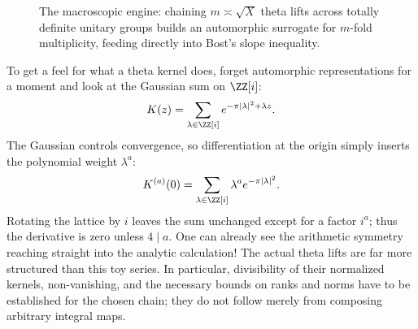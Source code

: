 \begin{figure}[htbp]
\centering
{}
\caption{The macroscopic engine: chaining \(m \asymp \sqrt{X}\) theta lifts across totally definite unitary groups builds an automorphic surrogate for \(m\)-fold multiplicity, feeding directly into Bost's slope inequality.}
\label{fig:N20261125-theta-chain}
\end{figure}

To get a feel for what a theta kernel does, forget automorphic representations for a moment and look at the Gaussian sum on \(\ZZ[i]\):
\[
 K(z)=\sum_{\lambda\in\ZZ[i]}e^{-\pi|\lambda|^2+\lambda z}.
\]
The Gaussian controls convergence, so differentiation at the origin simply inserts the polynomial weight \(\lambda^a\):
\[
 K^{(a)}(0)=\sum_{\lambda\in\ZZ[i]}\lambda^a
                                  e^{-\pi|\lambda|^2}.
\]
Rotating the lattice by \(i\) leaves the sum unchanged except for a factor \(i^a\); thus the derivative is zero unless \(4\mid a\). One can already see the arithmetic symmetry reaching straight into the analytic calculation! The actual theta lifts are far more structured than this toy series. In particular, divisibility of their normalized kernels, non-vanishing, and the necessary bounds on ranks and norms have to be established for the chosen chain; they do not follow merely from composing arbitrary integral maps.

